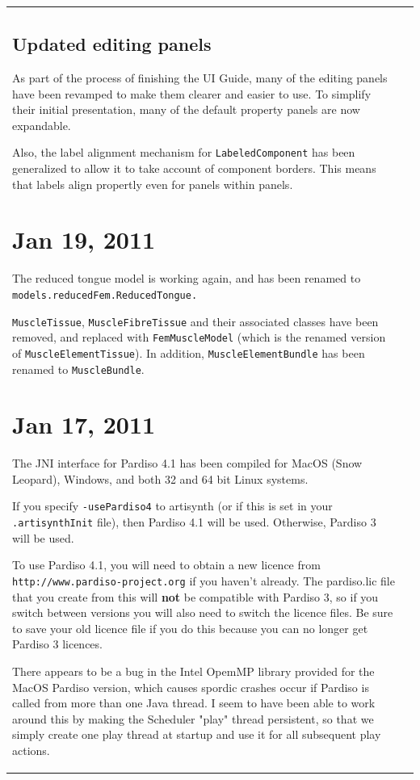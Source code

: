 \documentclass{article}
\begin{document}
\begin{tabular}{ll}
\subsection*{Updated editing panels}

As part of the process of finishing the UI Guide, many of the editing
panels have been revamped to make them clearer and easier to use. To
simplify their initial presentation, many of the default property
panels are now expandable.

Also, the label alignment mechanism for {\tt LabeledComponent} has been
generalized to allow it to take account of component borders. This
means that labels align propertly even for panels within panels.

\section*{Jan 19, 2011}

The reduced tongue model is working again, and has been renamed to
{\tt models.reducedFem.ReducedTongue.}

{\tt MuscleTissue}, {\tt MuscleFibreTissue} and their associated classes have
been removed, and replaced with {\tt FemMuscleModel} (which is the renamed
version of {\tt MuscleElementTissue}). In addition, {\tt MuscleElementBundle}
has been renamed to {\tt MuscleBundle}.

\section*{Jan 17, 2011}

The JNI interface for Pardiso 4.1 has been compiled for MacOS (Snow
Leopard), Windows, and both 32 and 64 bit Linux systems.
  
If you specify {\tt -usePardiso4} to artisynth (or if this is set in your
{\tt .artisynthInit} file), then Pardiso 4.1 will be used. Otherwise,
Pardiso 3 will be used.
  
To use Pardiso 4.1, you will need to obtain a new licence from
{\tt http://www.pardiso-project.org} if you haven't already. The pardiso.lic
file that you create from this will {\bf not} be compatible with Pardiso
3, so if you switch between versions you will also need to switch the
licence files. Be sure to save your old licence file if you do this
because you can no longer get Pardiso 3 licences.

There appears to be a bug in the Intel OpemMP library provided for the
MacOS Pardiso version, which causes spordic crashes occur if Pardiso
is called from more than one Java thread. I seem to have been able to
work around this by making the Scheduler "play" thread persistent, so
that we simply create one play thread at startup and use it for all
subsequent play actions.


\end{tabular}
\end{document}
